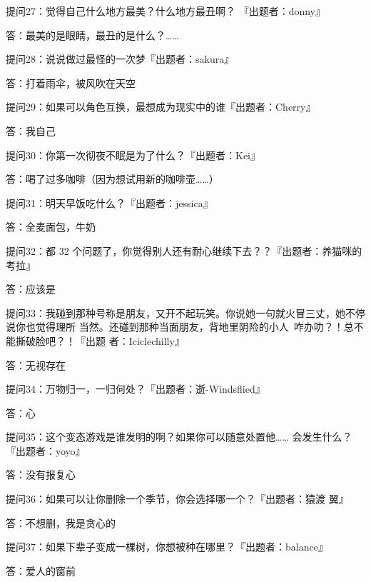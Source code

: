 		\vspace{1em}
		提问27：觉得自己什么地方最美？什么地方最丑啊？ 『出题者：donny』\par
		答：最美的是眼睛，最丑的是什么？……

		\vspace{1em}
		提问28：说说做过最怪的一次梦『出题者：sakura』\par
		答：打着雨伞，被风吹在天空

		\vspace{1em}
		提问29：如果可以角色互换，最想成为现实中的谁『出题者：Cherry』\par
		答：我自己

		\vspace{1em}
		提问30：你第一次彻夜不眠是为了什么？『出题者：Kei』\par
		答：喝了过多咖啡（因为想试用新的咖啡壶……）

		\vspace{1em}
		提问31：明天早饭吃什么？『出题者：jessica』\par
		答：全麦面包，牛奶

		\vspace{1em}
		提问32：都 32 个问题了，你觉得别人还有耐心继续下去？？『出题者：养猫咪的考拉』\par
		答：应该是

		\vspace{1em}
		提问33：我碰到那种号称是朋友，又开不起玩笑。你说她一句就火冒三丈，她不停说你也觉得理所
				当然。还碰到那种当面朋友，背地里阴险的小人~咋办叻？！总不能撕破脸吧？！『出题
				者：Iciclechilly』\par
		答：无视存在

		\vspace{1em}
		提问34：万物归一，一归何处？『出题者：逝-Windsflied』\par
		答：心

		\vspace{1em}
		提问35：这个变态游戏是谁发明的啊？如果你可以随意处置他…… 会发生什么？ 『出题者：yoyo』\par
		答：没有报复心

		\vspace{1em}
		提问36：如果可以让你删除一个季节，你会选择哪一个？『出题者：猿渡 翼』\par
		答：不想删，我是贪心的

		\vspace{1em}
		提问37：如果下辈子变成一棵树，你想被种在哪里？『出题者：balance』\par
		答：爱人的窗前

